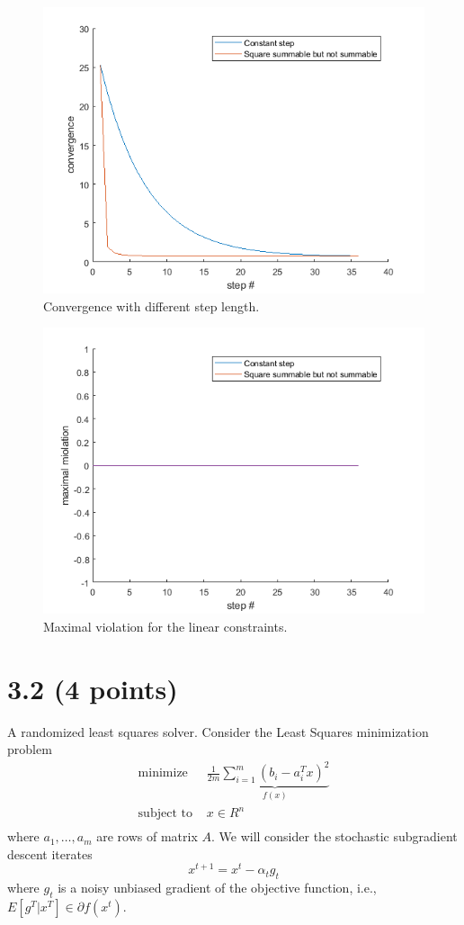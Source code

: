 \documentclass{article}
\begin{document}
\begin{figure}[H]
	\includegraphics[width=\linewidth]{fig_3_1_1.png}
	\caption{Convergence with different step length.}
	\label{fig:3_1_1}
\end{figure}

\begin{figure}[H]
	\includegraphics[width=\linewidth]{fig_3_1_2.png}
	\caption{Maximal violation for the linear constraints.}
	\label{fig:3_1_2}
\end{figure}



\section*{3.2 (4 points)} 
A randomized least squares solver. Consider the Least Squares minimization
problem
\begin{align*}
	\text{minimize } & \frac{1}{2 m} 
	\underbrace{\sum_{i = 1}^{m}
	(b_i - a_i^T x)^2}_{f(x)}
	\\
	\text{subject to } & x \in R^n \\
\end{align*}
where $a_1, \dots , a_m$ are rows of matrix $A.$
We will consider the stochastic
subgradient descent iterates
$$
x^{t + 1} = x^t - \alpha_t g_t
$$
where $g_t$ is a noisy unbiased gradient of the objective function, i.e., $E[g^T|x^T] \in \partial f(x^t). $ \\
\end{document}
